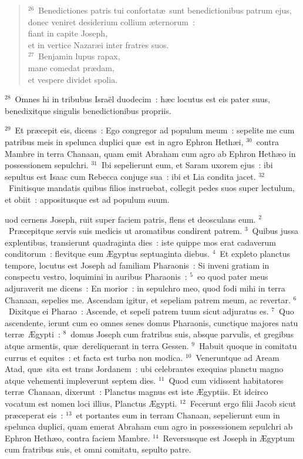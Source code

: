 \begin{flushleft}
\begin{verse}
${}^{26}$~Benedictiones patris tui confortat\ae\ sunt benedictionibus patrum ejus,\\ donec veniret desiderium collium \ae ternorum~:\\ fiant in capite Joseph,\\ et in vertice Nazar\ae i inter fratres suos.\\
${}^{27}$~Benjamin lupus rapax,\\ mane comedat pr\ae dam,\\ et vespere dividet spolia.\end{verse}\end{flushleft}


${}^{28}$~Omnes hi in tribubus Isra\"el duodecim~: h\ae c locutus est eis pater suus, benedixitque singulis benedictionibus propriis.


${}^{29}$~Et pr\ae cepit eis, dicens~: Ego congregor ad populum meum~: sepelite me cum patribus meis in spelunca duplici qu\ae\ est in agro Ephron Heth\ae i,
${}^{30}$~contra Mambre in terra Chanaan, quam emit Abraham cum agro ab Ephron Heth\ae o in possessionem sepulchri.
${}^{31}$~Ibi sepelierunt eum, et Saram uxorem ejus~: ibi sepultus est Isaac cum Rebecca conjuge sua~: ibi et Lia condita jacet.
${}^{32}$~Finitisque mandatis quibus filios instruebat, collegit pedes suos super lectulum, et obiit~: appositusque est ad populum suum.

\bchapter
{}uod cernens Joseph, ruit super faciem patris, flens et deosculans eum.
${}^{2}$~Pr\ae cepitque servis suis medicis ut aromatibus condirent patrem.
${}^{3}$~Quibus jussa explentibus, transierunt quadraginta dies~: iste quippe mos erat cadaverum conditorum~: flevitque eum \AE gyptus septuaginta diebus.
${}^{4}$~Et expleto planctus tempore, locutus est Joseph ad familiam Pharaonis~: Si inveni gratiam in conspectu vestro, loquimini in auribus Pharaonis~:
${}^{5}$~eo quod pater meus adjuraverit me dicens~: En morior~: in sepulchro meo, quod fodi mihi in terra Chanaan, sepelies me. Ascendam igitur, et sepeliam patrem meum, ac revertar.
${}^{6}$~Dixitque ei Pharao~: Ascende, et sepeli patrem tuum sicut adjuratus es.
${}^{7}$~Quo ascendente, ierunt cum eo omnes senes domus Pharaonis, cunctique majores natu terr\ae\ \AE gypti~:
${}^{8}$~domus Joseph cum fratribus suis, absque parvulis, et gregibus atque armentis, qu\ae\ dereliquerant in terra Gessen.
${}^{9}$~Habuit quoque in comitatu currus et equites~: et facta est turba non modica.
${}^{10}$~Veneruntque ad Aream Atad, qu\ae\ sita est trans Jordanem~: ubi celebrantes exequias planctu magno atque vehementi impleverunt septem dies.
${}^{11}$~Quod cum vidissent habitatores terr\ae\ Chanaan, dixerunt~: Planctus magnus est iste \AE gyptiis. Et idcirco vocatum est nomen loci illius, Planctus \AE gypti.
${}^{12}$~Fecerunt ergo filii Jacob sicut pr\ae ceperat eis~:
${}^{13}$~et portantes eum in terram Chanaan, sepelierunt eum in spelunca duplici, quam emerat Abraham cum agro in possessionem sepulchri ab Ephron Heth\ae o, contra faciem Mambre.
${}^{14}$~Reversusque est Joseph in \AE gyptum cum fratribus suis, et omni comitatu, sepulto patre.


